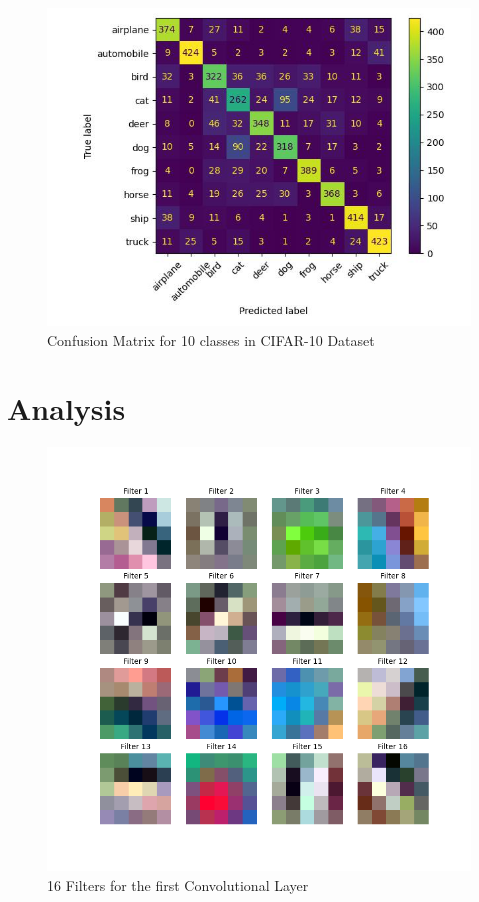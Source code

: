 \documentclass{article}
\begin{document}
\begin{figure}[]
    \centering
    \includegraphics[width=5in]{plots_final/class_confusion_matrix.jpg}
    \caption{Confusion Matrix for 10 classes in CIFAR-10 Dataset}
    \label{fig:conf-mat}
\end{figure}

\section{Analysis}


\begin{figure}[]
    \centering
    \includegraphics[width=5in]{plots_final/filters.png}
    \caption{16 Filters for the first Convolutional Layer}
    \label{fig:filters}
\end{figure}
\end{document}
